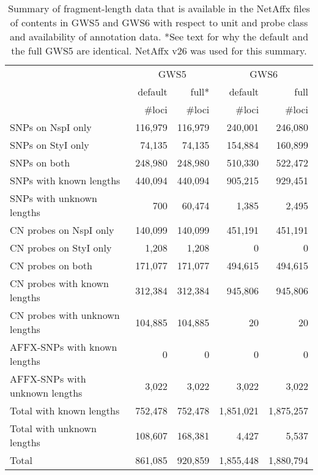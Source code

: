 \documentclass[10pt,a4paper]{article}
\newcommand{\GWSFive}{GWS5\xspace}
\newcommand{\GWSSix}{GWS6\xspace}
\begin{document}
\begin{table}[htp]
\begin{center}
\begin{tabular}{|l||rr||rr|}
\hline
     & \multicolumn{2}{c||}{\GWSFive} & \multicolumn{2}{c|}{\GWSSix} \\
     & default & full* & default & full \\
     & \#loci & \#loci & \#loci & \#loci \\
\hline
\hline
SNPs on NspI only        & 116,979 &  116,979  &   240,001 &   246,080 \\
SNPs on StyI only        &  74,135 &   74,135  &   154,884 &   160,899 \\
SNPs on both             & 248,980 &  248,980  &   510,330 &   522,472 \\
\hline
SNPs with known lengths  & 440,094 &  440,094  &   905,215 &   929,451 \\
SNPs with unknown lengths&     700 &   60,474  &     1,385 &     2,495 \\
\hline
\hline
CN probes on NspI only   & 140,099 &  140,099  &   451,191 &   451,191 \\
CN probes on StyI only   &   1,208 &    1,208  &         0 &         0 \\
CN probes on both        & 171,077 &  171,077  &   494,615 &   494,615 \\
\hline
CN probes with known lengths   & 312,384 &  312,384  &   945,806 &   945,806 \\
CN probes with unknown lengths & 104,885 &  104,885  &        20 &        20 \\
\hline
\hline
AFFX-SNPs with known lengths   &       0 &        0  &         0 &         0 \\
AFFX-SNPs with unknown lengths &   3,022 &    3,022  &     3,022 &     3,022 \\
\hline
\hline
Total with known lengths       & 752,478 &  752,478  & 1,851,021 & 1,875,257 \\
Total with unknown lengths     & 108,607 &  168,381  &     4,427 &     5,537 \\
\hline
Total                          & 861,085 &  920,859  & 1,855,448 & 1,880,794 \\
\hline
\end{tabular}
\end{center}
\caption{Summary of fragment-length data that is available in the NetAffx files of contents in GWS5 and GWS6 with respect to unit and probe class and availability of annotation data.  *See text for why the default and the full GWS5 are identical.  NetAffx v26 was used for this summary.}
\label{tblFragmentLengths}
\end{table}
\end{document}
